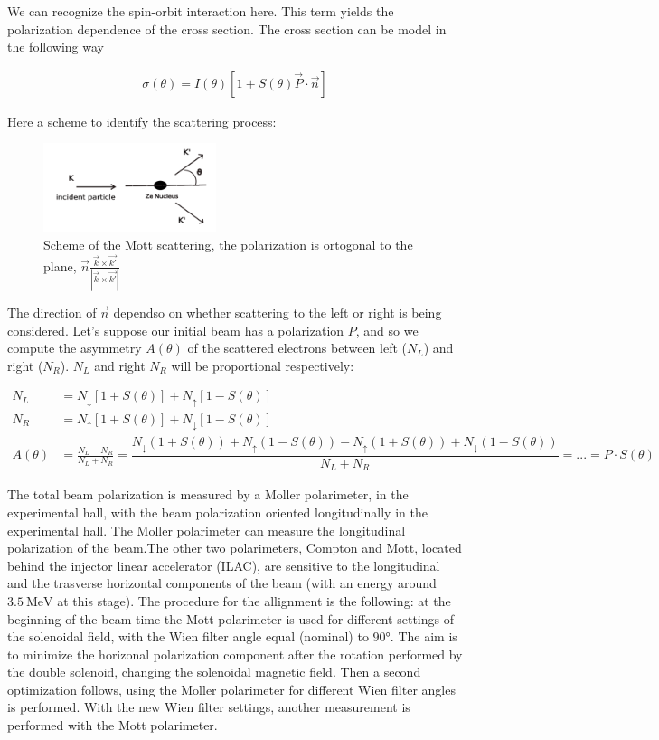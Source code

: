 We can recognize the spin-orbit interaction here. This term yields the polarization dependence of the cross section. The cross section can be model in the following way

\begin{align*}
\sigma(\theta) = I(\theta) [1 + S(\theta) \vec{P} \cdot \vec{n} ]
\end{align*}

Here a scheme to identify the scattering process: 

\begin{figure}[hbtp]
\centering
\includegraphics[width = 0.45\textwidth]{ExperimentalSetup/mottFig.png}
\caption{Scheme of the Mott scattering, the polarization is ortogonal to the plane,  $ \vec{n} \frac{\vec{k} \times \vec{k'}}{|\vec{k} \times \vec{k'}|}$}
\end{figure}

The direction of $\vec{n}$ dependso on whether scattering to the left or right is being considered. Let's suppose our initial beam has a polarization $P$, and so we compute the asymmetry $A(\theta)$ of the scattered electrons between left ($N_{L}$) and right ($N_{R}$). $N_{L}$ and right $N_{R}$ will be proportional respectively:


\begin{align*}
N_{L} &= N_{\downarrow}[1 + S(\theta)] + N_{\uparrow}[1 - S(\theta)] \\
N_{R} &= N_{\uparrow}[1 + S(\theta)] + N_{\downarrow}[1 - S(\theta)]  \\
A(\theta) &= \frac{N_{L} - N_{R}}{N_{L} + N_{R}} = \dfrac{N_{\downarrow}(1 + S(\theta)) + N_{\uparrow}(1 - S(\theta)) - N_{\uparrow}(1 + S(\theta)) + N_{\downarrow}(1 - S(\theta))}{N_{L} + N_{R}} = ... = P \cdot S(\theta)
\end{align*}


The total beam polarization is measured by a Moller polarimeter, in the experimental hall, with the beam polarization oriented longitudinally in the experimental hall. The Moller polarimeter can measure the longitudinal polarization of the beam.The other two polarimeters, Compton and Mott, located behind the injector linear accelerator (ILAC), are sensitive to the longitudinal and the trasverse horizontal components of the beam (with an energy around $\SI{3.5}{\mega \electronvolt}$ at this stage). The procedure for the allignment is the following: at the beginning of the beam time the Mott polarimeter is used for different settings of the solenoidal field, with the Wien filter angle equal (nominal) to $\ang{90}$. The aim is to minimize the horizonal polarization component after the rotation performed by the double solenoid, changing the solenoidal magnetic field. Then a second optimization follows, using the Moller polarimeter for different Wien filter angles is performed. With the new Wien filter settings, another measurement is performed with the Mott polarimeter.

